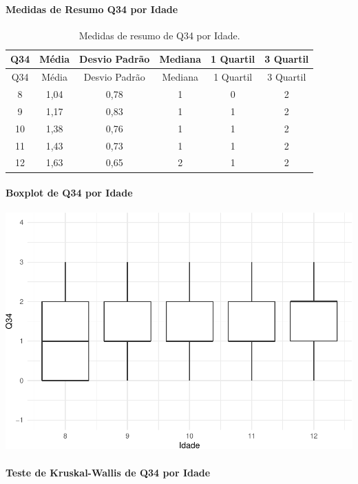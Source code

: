 \documentclass[]{article}
\let\oldparagraph\paragraph
\renewcommand{\paragraph}[1]{\oldparagraph{#1}\mbox{}}
\begin{document}
\cleardoublepage

\hypertarget{medidas-de-resumo-q34-por-idade}{%
\paragraph{Medidas de Resumo Q34 por Idade}\label{medidas-de-resumo-q34-por-idade}}

\begin{longtable}[]{@{}cccccc@{}}
\caption{\label{tab:unnamed-chunk-1216}Medidas de resumo de Q34 por Idade.}\tabularnewline
\toprule
Q34 & Média & Desvio Padrão & Mediana & 1 Quartil & 3 Quartil\tabularnewline
\midrule
\endfirsthead
\toprule
Q34 & Média & Desvio Padrão & Mediana & 1 Quartil & 3 Quartil\tabularnewline
\midrule
\endhead
8 & 1,04 & 0,78 & 1 & 0 & 2\tabularnewline
9 & 1,17 & 0,83 & 1 & 1 & 2\tabularnewline
10 & 1,38 & 0,76 & 1 & 1 & 2\tabularnewline
11 & 1,43 & 0,73 & 1 & 1 & 2\tabularnewline
12 & 1,63 & 0,65 & 2 & 1 & 2\tabularnewline
\bottomrule
\end{longtable}

\hypertarget{boxplot-de-q34-por-idade}{%
\paragraph{Boxplot de Q34 por Idade}\label{boxplot-de-q34-por-idade}}

\begin{center}\includegraphics[width=0.75\linewidth]{relatorio_covid19_files/figure-latex/unnamed-chunk-1217-1} \end{center}

\hypertarget{teste-de-kruskal-wallis-de-q34-por-idade}{%
\paragraph{Teste de Kruskal-Wallis de Q34 por Idade}\label{teste-de-kruskal-wallis-de-q34-por-idade}}
\end{document}
